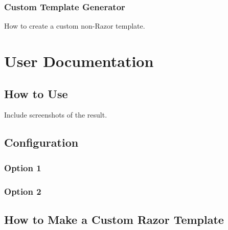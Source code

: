 \subsection{Custom Template Generator}
How to create a custom non-Razor template.

\chapter{User Documentation}

\section{How to Use}
Include screenshots of the result.

\section{Configuration}
\subsection{Option 1}
\subsection{Option 2}

\section{How to Make a Custom Razor Template}
